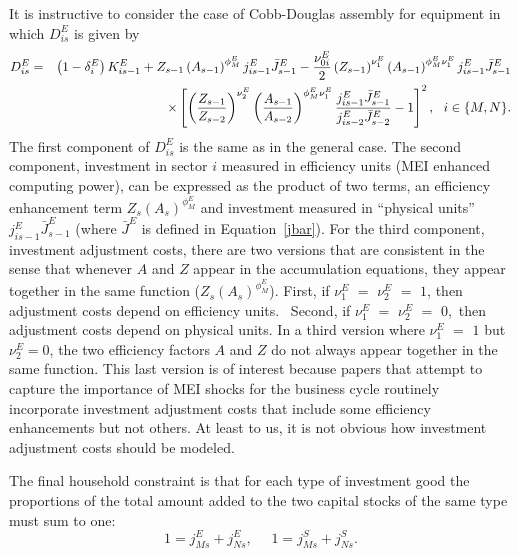 \documentclass[12pt,fleqn]{article}
\begin{document}
{\normalsize It is instructive to consider the case of Cobb-Douglas assembly
for equipment in which $D_{is}^{E}$ is given by
\begin{eqnarray}
D_{is}^{E} &=& \left( 1-\delta_i^{E}\right) K_{is-1}^{E}+Z_{s-1}\left(
A_{s-1}\right) ^{\phi _{M}^{E}}j_{is-1}^{E}\bar{J}_{s-1}^{E}-\frac{\nu
_{0i}^{E}}{2}\left( Z_{s-1}\right) ^{\nu _{1}^{E}}\left( A_{s-1}\right)
^{\phi _{M}^{E}\nu _{1}^{E}}j_{is-1}^{E}\bar{J}_{s-1}^{E}  \notag \\
&& \times \left[ \left( \frac{Z_{s-1}}{Z_{s-2}}\right) ^{\nu _{2}^{E}}\left(
\frac{A_{s-1}}{A_{s-2}}\right) ^{\phi _{M}^{E}\nu _{1}^{E}}\frac{j_{is-1}^{E}%
\bar{J}_{s-1}^{E}}{j_{is-2}^{E}\bar{J}_{s-2}^{E}}-1\right] ^{2},\,\,\,\,i\in
\{M,N\}.  \label{D_cd}
\end{eqnarray}
The first component of $D_{is}^{E}$ is the same as in the
general case. The second component, investment in sector $i$ measured in
efficiency units (MEI enhanced computing power), can be expressed as the product of two
terms, an efficiency enhancement term $Z_{s}\left( A_{s}\right) ^{\phi
_{M}^{E}}$ and investment measured in ``physical units'' $j_{is-1}^{E}\bar{J}%
_{s-1}^{E}$ (where $\bar{J}^{E}$ is defined in {Equation~\ref{jbar}}). For
the third component, investment adjustment costs, there are two versions
that are consistent in the sense that whenever $A$ and $Z$ appear in the
accumulation equations, they appear together in the same function ($%
Z_{s}\left( A_{s}\right) ^{\phi _{M}^{E}}$). First, if $\nu _{1}^{E}$ $=$ $%
\nu _{2}^{E}$  $=$ $1$, then adjustment
costs depend on efficiency units. \ Second, if $\nu _{1}^{E}$ $=$ $\nu
_{2}^{E}$ $=$ $0,$ then adjustment
costs depend on physical units. In a third version where $\nu _{1}^{E}$ $=$  $1$ but $\nu _{2}^{E}=0$, the two
efficiency factors $A$ and $Z$ do not always appear together in the same
function. This last version is of interest because papers that attempt to
capture the importance of MEI shocks for the business cycle routinely
incorporate investment adjustment costs that include some efficiency
enhancements but not others. At least to
us, it is not obvious how investment adjustment costs should be modeled. }

{\normalsize The final household constraint is that for each type of
investment good the proportions of the total amount added to the two capital
stocks of the same type must sum to one:
\begin{equation*}
1=j_{Ms}^{E}+j_{Ns}^{E},\,\,\,\,\,\,\,\,1=j_{Ms}^{S}+j_{Ns}^{S}.
\end{equation*}
}
\end{document}
